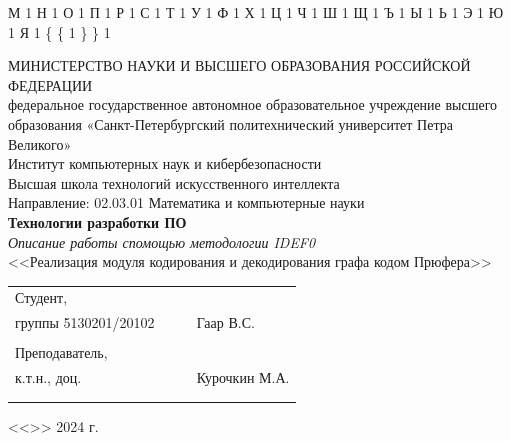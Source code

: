 \documentclass[a4paper, final]{article}
\begin{document}
{  {М}{ {\selectfont{}} }1
  {Н}{ {\selectfont{}} }1
  {О}{ {\selectfont{}} }1
  {П}{ {\selectfont{}} }1
  {Р}{ {\selectfont{}} }1
  {С}{ {\selectfont{}} }1
  {Т}{ {\selectfont{}} }1
  {У}{ {\selectfont{}} }1
  {Ф}{ {\selectfont{}} }1
  {Х}{ {\selectfont{}} }1
  {Ц}{ {\selectfont{}} }1
  {Ч}{ {\selectfont{}} }1
  {Ш}{ {\selectfont{}} }1
  {Щ}{ {\selectfont{}} }1
  {Ъ}{ {\selectfont{}} }1
  {Ы}{ {\selectfont{}} }1
  {Ь}{ {\selectfont{}} }1
  {Э}{ {\selectfont{}} }1
  {Ю}{ {\selectfont{}} }1
  {Я}{ {\selectfont{}} }1
  {\{}{ { {\color{brackets}\{} } }1 %
  {\} }{ { {\color{brackets}\} } } }1 %
}

\begin{center}
\hfill \break
\hfill \break
\normalsize{МИНИСТЕРСТВО НАУКИ И ВЫСШЕГО ОБРАЗОВАНИЯ РОССИЙСКОЙ ФЕДЕРАЦИИ\\
 федеральное государственное автономное образовательное учреждение высшего образования «Санкт-Петербургский политехнический университет Петра Великого»\\[5pt]}
\normalsize{Институт компьютерных наук и кибербезопасности}\\[5pt] 
\normalsize{Высшая школа технологий искусственного интеллекта}\\[5pt] 
\normalsize{Направление: 02.03.01 Математика и компьютерные науки}\\

\hfill \break
\hfill \break
\hfill \break
\large{\textbf{Технологии разработки ПО}}\\
\hfill \break
\large{\textit{Описание работы спомощью методологии IDEF0}}\\
\large{<<Реализация модуля кодирования и декодирования графа кодом Прюфера>>}

\hfill \break
\hfill \break
\end{center}
 
\small{ 
\begin{tabular}{lrrl}
\!\!\!Студент, & \hspace{2cm} & & \\
\!\!\!группы 5130201/20102 & \hspace{2cm} & \underline{\hspace{3cm}} & Гаар В.С. \\\\
\!\!\!Преподаватель, \hspace{2cm} & & \\
\!\!\!к.т.н., доц. & \hspace{2cm} & \underline{\hspace{3cm}} &  Курочкин М.А. \\\\
&&\hspace{5cm}
\end{tabular}
\begin{flushright}
<<\underline{\hspace{1cm}}>>\underline{\hspace{2.5cm}} 2024 г.
\end{flushright}
}
\end{document}
